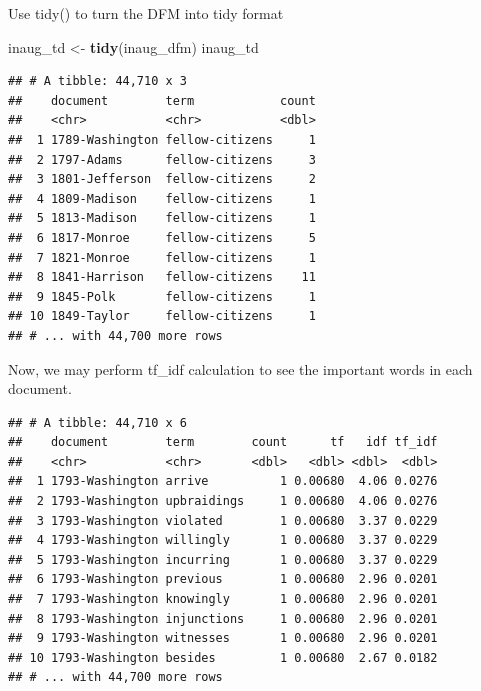 \documentclass[]{article}
\newenvironment{Shaded}{\begin{snugshade}}{\end{snugshade}}
\newcommand{\KeywordTok}[1]{\textcolor[rgb]{0.13,0.29,0.53}{\textbf{#1}}}
\newcommand{\NormalTok}[1]{#1}
\newcommand{\OperatorTok}[1]{\textcolor[rgb]{0.81,0.36,0.00}{\textbf{#1}}}
\newcommand{\StringTok}[1]{\textcolor[rgb]{0.31,0.60,0.02}{#1}}
\begin{document}
Use tidy() to turn the DFM into tidy format

\begin{Shaded}
\begin{Highlighting}[]
\NormalTok{inaug_td <-}\StringTok{ }\KeywordTok{tidy}\NormalTok{(inaug_dfm)}
\NormalTok{inaug_td}
\end{Highlighting}
\end{Shaded}

\begin{verbatim}
## # A tibble: 44,710 x 3
##    document        term            count
##    <chr>           <chr>           <dbl>
##  1 1789-Washington fellow-citizens     1
##  2 1797-Adams      fellow-citizens     3
##  3 1801-Jefferson  fellow-citizens     2
##  4 1809-Madison    fellow-citizens     1
##  5 1813-Madison    fellow-citizens     1
##  6 1817-Monroe     fellow-citizens     5
##  7 1821-Monroe     fellow-citizens     1
##  8 1841-Harrison   fellow-citizens    11
##  9 1845-Polk       fellow-citizens     1
## 10 1849-Taylor     fellow-citizens     1
## # ... with 44,700 more rows
\end{verbatim}

Now, we may perform tf\_idf calculation to see the important words in
each document.

\begin{Shaded}
\end{Shaded}

\begin{verbatim}
## # A tibble: 44,710 x 6
##    document        term        count      tf   idf tf_idf
##    <chr>           <chr>       <dbl>   <dbl> <dbl>  <dbl>
##  1 1793-Washington arrive          1 0.00680  4.06 0.0276
##  2 1793-Washington upbraidings     1 0.00680  4.06 0.0276
##  3 1793-Washington violated        1 0.00680  3.37 0.0229
##  4 1793-Washington willingly       1 0.00680  3.37 0.0229
##  5 1793-Washington incurring       1 0.00680  3.37 0.0229
##  6 1793-Washington previous        1 0.00680  2.96 0.0201
##  7 1793-Washington knowingly       1 0.00680  2.96 0.0201
##  8 1793-Washington injunctions     1 0.00680  2.96 0.0201
##  9 1793-Washington witnesses       1 0.00680  2.96 0.0201
## 10 1793-Washington besides         1 0.00680  2.67 0.0182
## # ... with 44,700 more rows
\end{verbatim}
\end{document}
